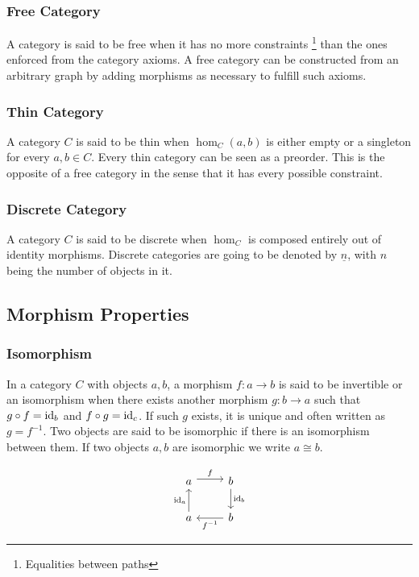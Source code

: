 \subsubsection*{Free Category}
A category is said to be free when it has no more constraints
\footnote{Equalities between paths} than the ones enforced from the category
axioms. \parencite{adamek_herrlich_strecker:joy_cats} A free category can be
constructed from an arbitrary graph by adding morphisms as necessary to fulfill
such axioms.

\subsubsection*{Thin Category}
A category $C$ is said to be thin when $\hom_C(a, b)$ is either empty or
a singleton for every $a,b\in C$. \parencite{adamek_herrlich_strecker:joy_cats}
Every thin category can be seen as a preorder. This is the opposite of a free
category in the sense that it has every possible constraint.

\subsubsection*{Discrete Category}
A category $C$ is said to be discrete when $\hom_C$ is composed entirely
out of identity morphisms. \parencite{awodey:category_theory} Discrete
categories are going to be denoted by $\underline{n}$, with $n$ being the number
of objects in it.

\subsection{Morphism Properties}

\subsubsection*{Isomorphism}
In a category $C$ with objects $a, b$, a morphism $f: a\to b$ is said to be
invertible or an isomorphism when there exists another morphism $g:b \to a$ such
that $g\circ f = \mathrm{id}_b$ and $f\circ g = \mathrm{id}_c$.
\parencite{maclane:working_mathematician}
If such $g$ exists, it is unique and often written as $g= f^{-1}$. Two objects
are said to be isomorphic if there is an isomorphism between them. If two
objects $a,b$ are isomorphic we write $a\cong b$.

\[\begin{tikzcd}
	a & b \\
	a & b
	\arrow["f", shift left=1, from=1-1, to=1-2]
	\arrow["{f^{-1}}", from=2-2, to=2-1]
	\arrow["{\id_a}", from=2-1, to=1-1]
	\arrow["{\id_b}", from=1-2, to=2-2]
\end{tikzcd}\]

